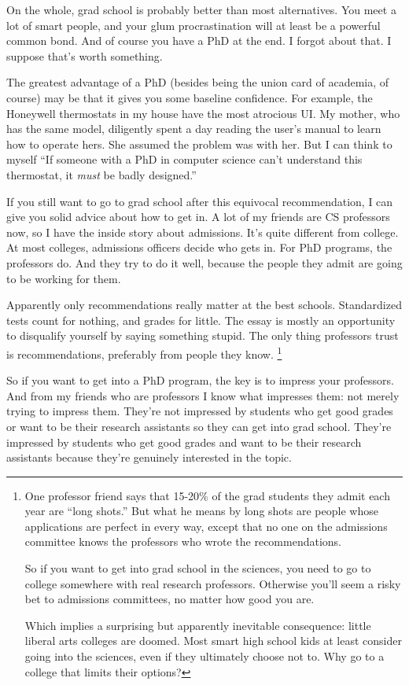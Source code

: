 On the whole, grad school is probably better than most alternatives. You
meet a lot of smart people, and your glum procrastination will at least
be a powerful common bond. And of course you have a PhD at the end. I
forgot about that. I suppose that's worth something.

The greatest advantage of a PhD (besides being the union card of
academia, of course) may be that it gives you some baseline confidence.
For example, the Honeywell thermostats in my house have the most
atrocious UI. My mother, who has the same model, diligently spent a day
reading the user's manual to learn how to operate hers. She assumed the
problem was with her. But I can think to myself ``If someone with a PhD
in computer science can't understand this thermostat, it \emph{must} be
badly designed.''

If you still want to go to grad school after this equivocal
recommendation, I can give you solid advice about how to get in. A lot
of my friends are CS professors now, so I have the inside story about
admissions. It's quite different from college. At most colleges,
admissions officers decide who gets in. For PhD programs, the professors
do. And they try to do it well, because the people they admit are going
to be working for them.

Apparently only recommendations really matter at the best schools.
Standardized tests count for nothing, and grades for little. The essay
is mostly an opportunity to disqualify yourself by saying something
stupid. The only thing professors trust is recommendations, preferably
from people they know. \footnote{One professor friend says that 15-20\% of the grad students they
admit each year are ``long shots.'' But what he means by long shots are
people whose applications are perfect in every way, except that no one
on the admissions committee knows the professors who wrote the
recommendations.

So if you want to get into grad school in the sciences, you need to go
to college somewhere with real research professors. Otherwise you'll
seem a risky bet to admissions committees, no matter how good you are.

Which implies a surprising but apparently inevitable consequence: little
liberal arts colleges are doomed. Most smart high school kids at least
consider going into the sciences, even if they ultimately choose not to.
Why go to a college that limits their options?}

So if you want to get into a PhD program, the key is to impress your
professors. And from my friends who are professors I know what impresses
them: not merely trying to impress them. They're not impressed by
students who get good grades or want to be their research assistants so
they can get into grad school. They're impressed by students who get
good grades and want to be their research assistants because they're
genuinely interested in the topic.

